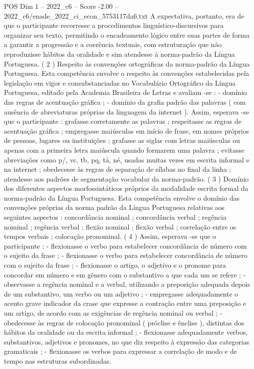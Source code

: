 \begin{textsample}{POS Dim 1 – 2022\_c6 – Score -2.00 – 2022\_c6/enade\_2022\_ci\_econ\_5753117da6.txt}
A expectativa, portanto, era de que o participante recorresse a procedimentos linguístico-discursivos para organizar seu texto, permitindo o encadeamento lógico entre suas partes de forma a garantir a progressão e a coerência textuais, com estruturação que não reproduzisse hábitos da oralidade e sim atendesse à norma-padrão da Língua Portuguesa. ( 2 ) Respeito às convenções ortográficas da norma-padrão da Língua Portuguesa.
Esta competência envolve o respeito às convenções estabelecidas pela legislação em vigor e consubstanciadas no Vocabulário Ortográfico da Língua Portuguesa, editado pela Academia Brasileira de Letras e avaliam -se : - domínio das regras de acentuação gráfica ; - domínio da grafia padrão das palavras ( com ausência de abreviaturas próprias da linguagem da internet ).
Assim, esperava -se que o participante : grafasse corretamente as palavras ; respeitasse as regras de acentuação gráfica ; empregasse maiúsculas em início de frase, em nomes próprios de pessoas, lugares ou instituições ; grafasse as siglas com letras maiúsculas ou apenas com a primeira letra maiúscula quando formarem uma palavra ; evitasse abreviações como p/, vc, tb, pq, tá, né, usadas muitas vezes em escrita informal e na internet ; obedecesse às regras de separação de sílabas no final da linha ; atendesse aos padrões de segmentação vocabular da norma-padrão. ( 3 ) Domínio dos diferentes aspectos morfossintáticos próprios da modalidade escrita formal da norma-padrão da Língua Portuguesa.
Esta competência envolve o domínio das convenções próprias da norma padrão da Língua Portuguesa relativas aos seguintes aspectos : concordância nominal ; concordância verbal ; regência nominal ; regência verbal ; flexão nominal ; flexão verbal ; correlação entre os tempos verbais ; colocação pronominal. ( 4 ) Assim, esperava -se que o participante : - flexionasse o verbo para estabelecer concordância de número com o sujeito da frase ; - flexionasse o verbo para estabelecer concordância de número com o sujeito da frase ; - flexionasse o artigo, o adjetivo e o pronome para concordar em número e em gênero com o substantivo a que cada um se refere ; - observasse a regência nominal e a verbal, utilizando a preposição adequada depois de um substantivo, um verbo ou um adjetivo ; - empregasse adequadamente o acento grave indicador da crase que expresse a contração entre uma preposição e um artigo, de acordo com as exigências de regência nominal ou verbal ; - obedecesse às regras de colocação pronominal ( próclise e ênclise ), distintas dos hábitos da oralidade ou da escrita informal ; - flexionasse adequadamente verbos, substantivos, adjetivos e pronomes, no que diz respeito à expressão das categorias gramaticais ; - flexionasse os verbos para expressar a correlação de modo e de tempo nas estruturas subordinadas.

\end{textsample}
